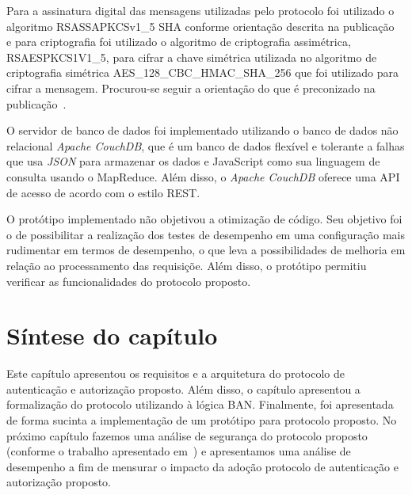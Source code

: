 Para a assinatura digital das mensagens utilizadas pelo protocolo foi utilizado o algoritmo RSASSA\-PKCS\-v1\_5 SHA conforme orientação descrita na publicação~\cite{ietfjws} e para criptografia foi utilizado o algoritmo de criptografia assimétrica, RSAES\-PKCS1\-V1\_5, para cifrar a chave simétrica utilizada no algoritmo de criptografia simétrica AES\_128\_CBC\_HMAC\_SHA\_256 que foi utilizado para cifrar a mensagem. Procurou-se seguir a orientação do que é preconizado na publicação~\cite{jwt2014}.

O servidor de banco de dados foi implementado utilizando o banco de dados não relacional \emph{Apache CouchDB}, que é um banco de dados flexível e tolerante a falhas que usa \emph{JSON} para armazenar os dados e JavaScript como sua linguagem de consulta usando o MapReduce. Além disso, o \emph{Apache CouchDB} oferece uma API de acesso de acordo com o estilo REST.

O protótipo implementado não objetivou a otimização de código. Seu objetivo foi o de possibilitar a realização dos testes de desempenho em uma configuração mais rudimentar em termos de desempenho, o que leva a possibilidades de melhoria em relação ao processamento das requisiçõe. Além disso, o protótipo permitiu verificar as funcionalidades do protocolo proposto.


\section{Síntese do capítulo}

Este capítulo apresentou os requisitos e a arquitetura do protocolo de autenticação e autorização proposto. Além disso, o capítulo apresentou a formalização do protocolo utilizando à lógica BAN. Finalmente, foi apresentada de forma sucinta a implementação de um protótipo para protocolo proposto. No próximo capítulo fazemos uma análise de segurança do protocolo proposto (conforme o trabalho apresentado em~\cite{traust08}) e apresentamos uma análise de desempenho a fim de mensurar o impacto da adoção protocolo de autenticação e autorização proposto. %